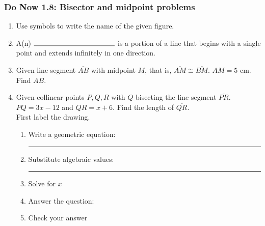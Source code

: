 \documentclass[12pt, oneside]{article}
\begin{document}
\subsubsection*{Do Now 1.8: Bisector and midpoint problems}
  \begin{enumerate}
    \item Use symbols to write the name of the given figure.
       \bigskip

    \item A(n) $\rule{4cm}{0.15mm}$ is a portion of a line that begins with a single point and extends infinitely in one direction.

    \item Given line segment $\overline{AB}$ with midpoint $M$, that is, $\overline{AM} \cong \overline{BM}$. $AM=5$ cm. Find $AB$.\\[0.75cm]
    \vspace{1cm}

    \item Given collinear points $P, Q, R$ with $Q$ bisecting the line segment $\overline{PR}$. $PQ=3x -12$ and $QR = x+6$. Find the length of $\overline{QR}$.\\First label the drawing.
    \begin{flushright}
    \end{flushright}
    \begin{enumerate}
      \item Write a geometric equation: \rule{4cm}{0.15mm} \vspace{.7cm}
      \item Substitute algebraic values: \rule{4cm}{0.15mm}
      \item Solve for $x$
      \vspace{2.5cm}
      \item Answer the question: \bigskip
      \item Check your answer
    \end{enumerate}


\end{enumerate}
\end{document}
